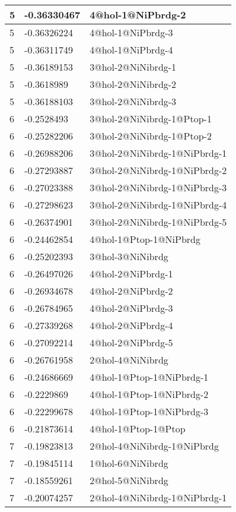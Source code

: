 \begin{center}
\begin{longtable}{|l|l|l|}
5 & -0.36330467 & 4@hol-1@NiPbrdg-2 \\ \hline
5 & -0.36326224 & 4@hol-1@NiPbrdg-3 \\ \hline
5 & -0.36311749 & 4@hol-1@NiPbrdg-4 \\ \hline
5 & -0.36189153 & 3@hol-2@NiNibrdg-1 \\ \hline
5 & -0.3618989 & 3@hol-2@NiNibrdg-2 \\ \hline
5 & -0.36188103 & 3@hol-2@NiNibrdg-3 \\ \hline
6 & -0.2528493 & 3@hol-2@NiNibrdg-1@Ptop-1 \\ \hline
6 & -0.25282206 & 3@hol-2@NiNibrdg-1@Ptop-2 \\ \hline
6 & -0.26988206 & 3@hol-2@NiNibrdg-1@NiPbrdg-1 \\ \hline
6 & -0.27293887 & 3@hol-2@NiNibrdg-1@NiPbrdg-2 \\ \hline
6 & -0.27023388 & 3@hol-2@NiNibrdg-1@NiPbrdg-3 \\ \hline
6 & -0.27298623 & 3@hol-2@NiNibrdg-1@NiPbrdg-4 \\ \hline
6 & -0.26374901 & 3@hol-2@NiNibrdg-1@NiPbrdg-5 \\ \hline
6 & -0.24462854 & 4@hol-1@Ptop-1@NiPbrdg \\ \hline
6 & -0.25202393 & 3@hol-3@NiNibrdg \\ \hline
6 & -0.26497026 & 4@hol-2@NiPbrdg-1 \\ \hline
6 & -0.26934678 & 4@hol-2@NiPbrdg-2 \\ \hline
6 & -0.26784965 & 4@hol-2@NiPbrdg-3 \\ \hline
6 & -0.27339268 & 4@hol-2@NiPbrdg-4 \\ \hline
6 & -0.27092214 & 4@hol-2@NiPbrdg-5 \\ \hline
6 & -0.26761958 & 2@hol-4@NiNibrdg \\ \hline
6 & -0.24686669 & 4@hol-1@Ptop-1@NiPbrdg-1 \\ \hline
6 & -0.2229869 & 4@hol-1@Ptop-1@NiPbrdg-2 \\ \hline
6 & -0.22299678 & 4@hol-1@Ptop-1@NiPbrdg-3 \\ \hline
6 & -0.21873614 & 4@hol-1@Ptop-1@Ptop \\ \hline
7 & -0.19823813 & 2@hol-4@NiNibrdg-1@NiPbrdg \\ \hline
7 & -0.19845114 & 1@hol-6@NiNibrdg \\ \hline
7 & -0.18559261 & 2@hol-5@NiNibrdg \\ \hline
7 & -0.20074257 & 2@hol-4@NiNibrdg-1@NiPbrdg-1 \\ \hline

\end{longtable}
\end{center}
